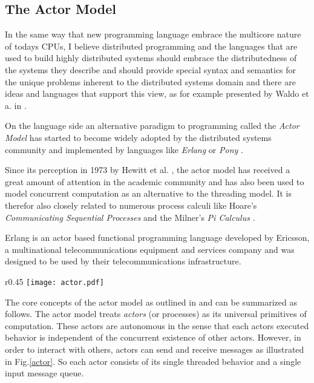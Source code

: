 \subsection{The Actor Model}
\label{actorModel}

In the same way that new programming language embrace the multicore
nature of todays CPUs, I believe distributed programming
and the languages that are used to build highly distributed
systems should embrace the distributedness of the systems they
describe and should provide special syntax and semantics
for the unique problems inherent to the distributed systems domain
and there are ideas and languages that support this
view, as for example presented by Waldo et a. in \cite{noteondistributed}.
\newline

On the language side an alternative paradigm to programming
called the \textit{Actor Model} \cite{actors73} \cite{actors2010}
has started to become widely adopted by the distributed systems
community and implemented by languages like
\textit{Erlang} \cite{erlang} \cite{armstrongerlang} or
\textit{Pony} \cite{pony}.

Since its perception in 1973 by Hewitt et al. \cite{actors73},
the actor model has received a great amount of attention in the
academic community and has also been used to model concurrent
computation as an alternative to the threading model. It is therefor
also closely related to numerous process calculi like Hoare's
\textit{Communicating Sequential Processes} \cite{hoarecsp} and
the Milner's \textit{Pi Calculus} \cite{pimilner}.

Erlang is an actor based functional programming language
developed by Ericsson, a multinational telecommunications equipment
and services company and was designed to be used by their
telecommunications infrastructure.
\newline

\begin{wrapfigure}{r}{0.45\textwidth}
  \vspace{-10mm}
  \texttt{[image: actor.pdf]}
  \caption{Concept of an \textit{Actor} as \\defined by the
          actor model.}
  \label{actor}
  \vspace{-25mm}
\end{wrapfigure}

The core concepts of the actor model as outlined in \cite{actorsagha}
and \cite{actors2010}
can be summarized as follows. The actor model treats \textit{actors}
(or processes) as its universal primitives of computation.
These actors are autonomous in the sense that each actors executed
behavior is independent of the concurrent existence of other actors.
However, in order to interact with others, actors can send and receive
messages as illustrated in Fig.\ref{actor}. So each actor consists
of its single threaded behavior and a single input message queue.

